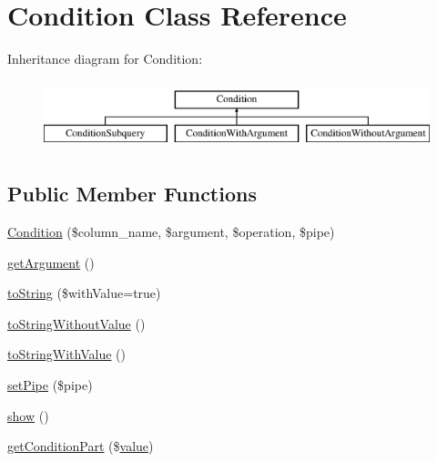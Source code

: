 \hypertarget{classCondition}{}\section{Condition Class Reference}
\label{classCondition}
Inheritance diagram for Condition\+:\begin{figure}[H]
\begin{center}
\leavevmode
\includegraphics[height=2.000000cm]{classCondition}
\end{center}
\end{figure}
\subsection*{Public Member Functions}
\begin{DoxyCompactItemize}
\item 
\hyperlink{classCondition_aaf108d388895d9fe832a52e5586c0ecb}{Condition} (\$column\+\_\+name, \$argument, \$operation, \$pipe)
\item 
\hyperlink{classCondition_a638fb386fab511447a1770d1653936ed}{get\+Argument} ()
\item 
\hyperlink{classCondition_aa4072b1db0e4f4d3a1dae0f1982781e1}{to\+String} (\$with\+Value=true)
\item 
\hyperlink{classCondition_ae472caca5533fe0442eb56fe38cc8ef1}{to\+String\+Without\+Value} ()
\item 
\hyperlink{classCondition_ac15dfd53b971b98fd34b7cfff99ab4c8}{to\+String\+With\+Value} ()
\item 
\hyperlink{classCondition_a5b8810c0b90532ea2bb73561c6d2f986}{set\+Pipe} (\$pipe)
\item 
\hyperlink{classCondition_a72cefb980f256f8c2ae6801e9c8868b9}{show} ()
\item 
\hyperlink{classCondition_a29b59a5ef75db900c012dc5111fb24cf}{get\+Condition\+Part} (\$\hyperlink{common_2js_2jquery_8js_abe5393d870043cf6aaa1d5ad5fce755c}{value})
\end{DoxyCompactItemize}
